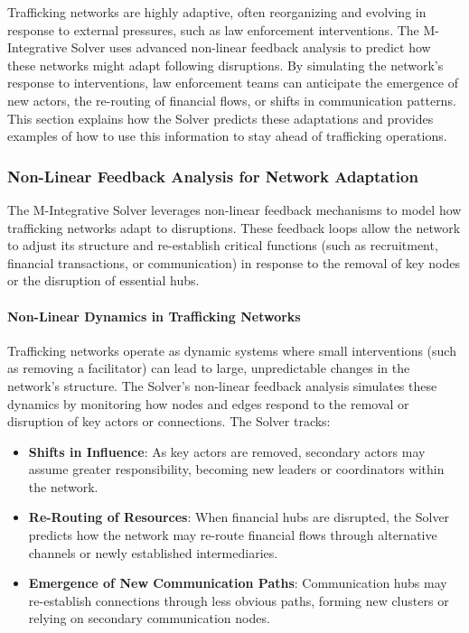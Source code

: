 \documentclass[%
 preprint, linenumbers,
 amsmath,amssymb,
 aps, physrev,
]{revtex4-2}
\begin{document}
Trafficking networks are highly adaptive, often reorganizing and evolving in response to external pressures, such as law enforcement interventions. The M-Integrative Solver uses advanced non-linear feedback analysis to predict how these networks might adapt following disruptions. By simulating the network’s response to interventions, law enforcement teams can anticipate the emergence of new actors, the re-routing of financial flows, or shifts in communication patterns. This section explains how the Solver predicts these adaptations and provides examples of how to use this information to stay ahead of trafficking operations.

\subsubsection{Non-Linear Feedback Analysis for Network Adaptation}

The M-Integrative Solver leverages non-linear feedback mechanisms to model how trafficking networks adapt to disruptions. These feedback loops allow the network to adjust its structure and re-establish critical functions (such as recruitment, financial transactions, or communication) in response to the removal of key nodes or the disruption of essential hubs.

\paragraph{Non-Linear Dynamics in Trafficking Networks}

Trafficking networks operate as dynamic systems where small interventions (such as removing a facilitator) can lead to large, unpredictable changes in the network’s structure. The Solver’s non-linear feedback analysis simulates these dynamics by monitoring how nodes and edges respond to the removal or disruption of key actors or connections. The Solver tracks:
\begin{itemize}
    \item \textbf{Shifts in Influence}: As key actors are removed, secondary actors may assume greater responsibility, becoming new leaders or coordinators within the network.
    \item \textbf{Re-Routing of Resources}: When financial hubs are disrupted, the Solver predicts how the network may re-route financial flows through alternative channels or newly established intermediaries.
    \item \textbf{Emergence of New Communication Paths}: Communication hubs may re-establish connections through less obvious paths, forming new clusters or relying on secondary communication nodes.
\end{itemize}
\end{document}
